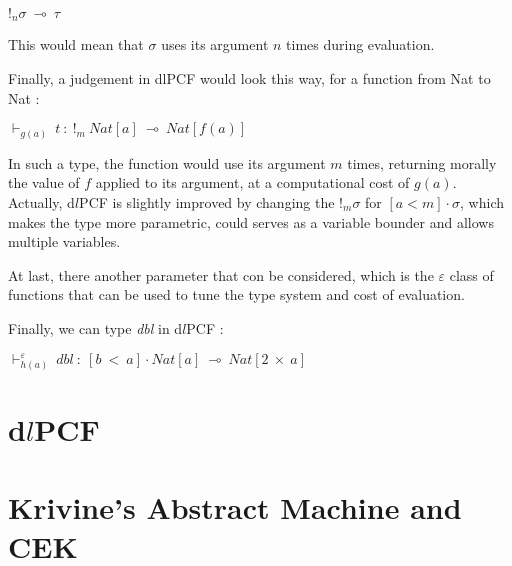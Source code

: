 \documentclass[a4paper,12pt]{report}
\begin{document}
\begin{center}
$!_{n}\sigma~\multimap~\tau$
\end{center} 

This would mean that $\sigma$ uses its argument $n$ times during evaluation. 

\medskip

Finally, a judgement in dlPCF would look this way, for a function from Nat to
Nat :

\begin{center}
$\vdash_{g(a)}~t~:~!_{m}~Nat[a]~\multimap~Nat[f(a)]$ 
\end{center}

In such a type, the function would use its argument $m$ times, returning morally
the value of $f$ applied to its argument, at a computational cost of
$g(a)$. Actually, d$l$PCF is slightly improved by changing the $!_{m}\sigma$ for
$[a < m] \cdot \sigma$, which makes the type more parametric, could serves as a
variable bounder and allows multiple variables.

At last, there another parameter that con be considered, which is the $\varepsilon$
class of functions that can be used to tune the type system and cost of
evaluation.

Finally, we can type \emph{dbl} in d$l$PCF :

\begin{center}
$\vdash^{\varepsilon}_{h(a)}~dbl~:~[b~<~a] \cdot Nat[a]~\multimap~Nat[2~\times~a]$
\end{center}

\section{d$l$PCF}



\section{Krivine's Abstract Machine and CEK}
\end{document}
